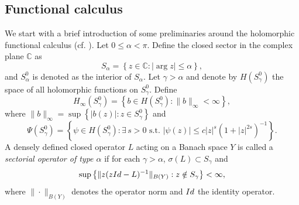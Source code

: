 \documentclass[oneside,english,a4wide]{amsart}
\numberwithin{equation}{section}
\numberwithin{figure}{section}
\theoremstyle{plain}
\theoremstyle{plain}
\theoremstyle{definition}
\theoremstyle{plain}
\theoremstyle{remark}
\theoremstyle{definition}
\newtheorem{definition}[thm]{Definition}
\theoremstyle{remark}
\theoremstyle{definition}
\newcommand{\com}{{\mathbb C}}
\newcommand{\ce}{{\mathbb E}}
\newcommand{\F}{{\mathcal F}}
\newcommand{\8}{+\infty}
\renewcommand{\1}{\mathbbm{1}}
\newcommand\sk[1]{ \left( #1 \right) }
\newcommand\lk[1]{ \left\{ #1 \right\} }
\begin{document}




\subsection{Functional calculus}\label{3.1}
We start with a brief introduction of some preliminaries around the holomorphic functional calculus (cf. \cite{Mcintosh1986}).
Let $0 \leq \alpha < \pi$. Define the closed sector in the complex plane $\com$ as
\[
    S_{\alpha} = \lk{ z \in \com: |\arg z| \leq \alpha },
\]
and $S_{\alpha}^0$ is denoted as the interior of $S_{\alpha}$.
Let $\gamma > \alpha$ and denote by $H(S_{\gamma}^0)$ the space of all holomorphic functions on $S_{\gamma}^0$. Define
\[
    H_{\infty}(S_{\gamma}^0) = \lk{ b \in H(S_{\gamma}^0) : \| b \|_\infty < \infty },
\]
where $\| b \|_\infty = \sup\lk{|b(z)|: z \in S_{\gamma}^0}$ and
\[
    \Psi(S_{\gamma}^0) = \lk{ \psi \in H(S_{\gamma}^0 ) : \exists\, s > 0 \text{ s.t. } |\psi(z)| \leq c|z|^s(1+|z|^{2s})^{-1} }.
\]
A densely defined closed operator $L$ acting on a Banach space $Y$ is called a \emph{sectorial operator of type $\alpha$} if for each $\gamma > \alpha$, $\sigma(L) \subset S_{\gamma}$ and 
\[
    \sup\lk{ \|z(z{\rm Id} - L)^{-1}\|_{B(Y)} : z \notin S_{\gamma} } < \infty,
\]
where $\| \cdot \|_{B(Y)}$ denotes the operator norm and ${\rm Id}$ the identity operator.
\end{document}
